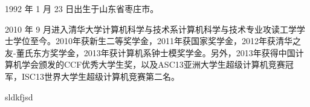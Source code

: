 \begin{resume}


  1992 年 1 月 23 日出生于山东省枣庄市。
  
  2010 年 9 月进入清华大学计算机科学与技术系计算机科学与技术专业攻读工学学士学位至今。2010年获新生二等奖学金，2011年获国家奖学金，2012年获清华之友-董氏东方奖学金，2013年获计算机系钟士模奖学金。另外，2013年获得中国计算机学会颁发的CCF优秀大学生奖，以及ASC13亚洲大学生超级计算机竞赛冠军，ISC13世界大学生超级计算机竞赛第二名。
  


  \begin{enumerate}[{[}1{]}]
  \item sldkfjsd
  \end{enumerate}
\end{resume}
